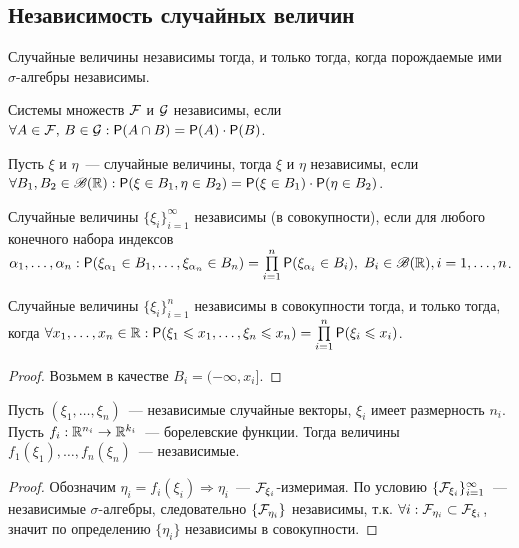 \subsection{Независимость случайных величин}
\begin{statement}
Случайные величины независимы тогда, и только тогда, когда порождаемые ими $\sigma$-алгебры независимы.
\end{statement}
\begin{definition}
	Системы множеств $\mathcal{F}$ и $\mathcal{G}$ независимы, если $\forall A \in \mathcal{F},\, B \in \mathcal{G} : \mathsf{P}(A \cap B) = \mathsf{P}(A)\cdot\mathsf{P}(B)$.
\end{definition}
\begin{definition}
	Пусть $\xi$ и $\eta$~--- случайные величины, тогда $\xi$ и $\eta$ независимы, если $\forall B_1, B_2 \in \mathscr{B}(\mathbb{R}) : \mathsf{P}(\xi \in B_1, \eta \in B_2) = \mathsf{P}(\xi \in B_1)\cdot\mathsf{P}(\eta \in B_2)$.
\end{definition}
\begin{definition}
	Случайные величины $\{\xi_i\}_{i = 1}^\infty$ независимы (в совокупности), если для любого конечного набора индексов $\alpha_1, \ldots, \alpha_n : \mathsf{P}(\xi_{\alpha_1} \in B_1, \ldots, \xi_{\alpha_n} \in B_n) = \prod\limits_{i = 1}^n\mathsf{P}(\xi_{\alpha_i} \in B_i),\; B_i \in \mathscr{B}(\mathbb{R}), i = 1, \ldots, n$.
\end{definition}
\begin{theorem}
	Случайные величины $\{\xi_i\}_{i = 1}^n$ независимы в совокупности тогда, и только тогда, когда $\forall x_1, \ldots, x_n \in \mathbb{R} : \mathsf{P}(\xi_1 \leqslant x_1, \ldots, \xi_n \leqslant x_n) = \prod\limits_{i = 1}^n\mathsf{P}(\xi_i \leqslant x_i)$.
	\begin{proof}
		Возьмем в качестве $B_i = (-\infty, x_i]$.
	\end{proof}
\end{theorem}
\begin{theorem}
	Пусть $(\xi_1, \ldots, \xi_n)$~--- независимые случайные векторы, $\xi_i$ имеет размерность $n_i$. Пусть $f_i: \mathbb{R}^{n_i} \rightarrow \mathbb{R}^{k_i}$~--- борелевские функции. Тогда величины $f_1(\xi_1), \ldots, f_n(\xi_n)$~--- независимые.
	\begin{proof}
		Обозначим $\eta_i = f_i(\xi_i) \Rightarrow \eta_i$~--- $\mathcal{F}_{\xi_i}$-измеримая. По условию $\{\mathcal{F}_{\xi_i}\}_{i = 1}^\infty$~--- независимые $\sigma$-алгебры, следовательно $\{\mathcal{F}_{\eta_i}\}$ независимы, т.к. $\forall i : \mathcal{F}_{\eta_i} \subset \mathcal{F}_{\xi_i}$, значит по определению $\{\eta_i\}$ независимы в совокупности.
	\end{proof}
\end{theorem}
